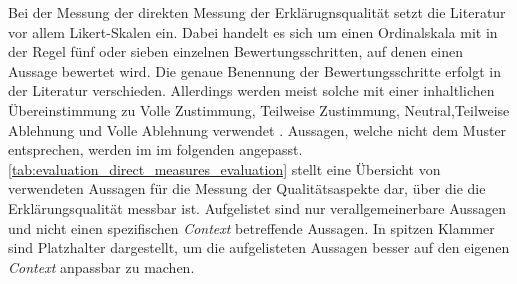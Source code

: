 \smallskip

Bei der Messung der direkten Messung der Erklärugnsqualität setzt die Literatur vor allem Likert-Skalen ein. Dabei handelt es sich um einen Ordinalskala mit in der Regel fünf oder sieben einzelnen Bewertungsschritten, auf denen einen Aussage bewertet wird. Die genaue Benennung der Bewertungsschritte erfolgt in der Literatur verschieden. Allerdings werden meist solche mit einer inhaltlichen Übereinstimmung zu \glqq Volle Zustimmung\grqq{}, \glqq Teilweise Zustimmung\grqq{}, \glqq Neutral\grqq{},\glqq Teilweise Ablehnung\grqq{} und \glqq Volle Ablehnung\grqq{} verwendet \cite{sato_action-triggering_2019, sato_context_nodate, wang_is_2018, hoffman_metrics_nodate, koo_understanding_2016, koo_why_2015}. Aussagen, welche nicht dem Muster entsprechen, werden im im folgenden angepasst. \autoref{tab:evaluation_direct_measures_evaluation} stellt eine Übersicht von verwendeten Aussagen für die Messung der Qualitätsaspekte dar, über die die Erklärungsqualität messbar ist. Aufgelistet sind nur verallgemeinerbare Aussagen und nicht einen spezifischen \textit{Context} betreffende Aussagen. In spitzen Klammer sind Platzhalter dargestellt, um die aufgelisteten Aussagen besser auf den eigenen \textit{Context} anpassbar zu machen.

